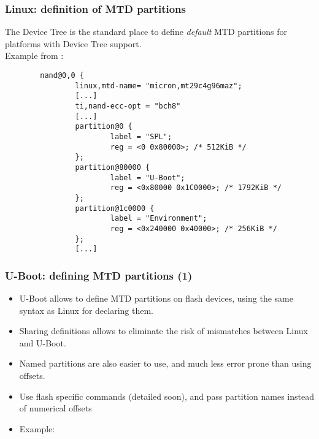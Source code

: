 \begin{frame}[fragile]
  \frametitle{Linux: definition of MTD partitions}
  \small
  The Device Tree is the standard place to define {\em default} MTD partitions
  for platforms with Device Tree support.\\
  Example from :
\begin{verbatim}
        nand@0,0 {
                linux,mtd-name= "micron,mt29c4g96maz";
                [...]
                ti,nand-ecc-opt = "bch8"
                [...]
                partition@0 {
                        label = "SPL";
                        reg = <0 0x80000>; /* 512KiB */
                };
                partition@80000 {
                        label = "U-Boot";
                        reg = <0x80000 0x1C0000>; /* 1792KiB */
                };
                partition@1c0000 {
                        label = "Environment";
                        reg = <0x240000 0x40000>; /* 256KiB */
                };
                [...]
\end{verbatim}
\end{frame}

\begin{frame}
  \frametitle{U-Boot: defining MTD partitions (1)}
  \begin{itemize}
  \item U-Boot allows to define MTD partitions on flash devices, using
        the same syntax as Linux for declaring them.
  \item Sharing definitions allows to eliminate the risk
        of mismatches between Linux and U-Boot.
  \item Named partitions are also easier to use, and much less error prone than using offsets.
  \item Use flash specific commands (detailed soon),
    and pass partition names instead of numerical offsets
  \item Example: 
  \end{itemize}
\end{frame}

